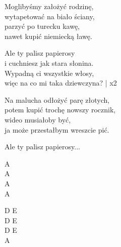 \begin{text}
    Moglibyśmy założyć rodzinę,\\
    wytapetować na biało ściany,\\
    parzyć po turecku kawę,\\
    nawet kupić niemiecką ławę.

    \vin Ale ty palisz papierosy\\
    \vin i cuchniesz jak stara słonina.\\
    \vin Wypadną ci wszystkie włosy,\\
    \vin więc na co mi taka dziewczyna? | x2

    Na malucha odłożyć parę złotych,\\
    potem kupić trochę nowszy rocznik,\\
    wideo musiałoby być,\\
    ja może przestałbym wreszcie pić.

    \vin Ale ty palisz papierosy...
\end{text}
\begin{chord}
    A\\
    A\\
    A\\
    A

    D E\\
    D E\\
    D E\\
    A
\end{chord}